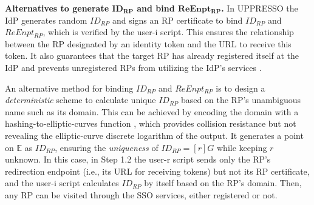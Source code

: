%


\noindent \textbf{Alternatives to generate $\boldsymbol{ID_{RP}}$ and bind $\boldsymbol{ReEnpt_{RP}}$.}
In UPPRESSO the IdP generates random $ID_{RP}$ and signs an RP certificate to bind $ID_{RP}$ and $ReEnpt_{RP}$, which is verified by the user-i script.
This ensures the relationship between the RP designated by an identity token and the URL to receive this token.
It also guarantees that the target RP has already registered itself at the IdP and prevents unregistered RPs from utilizing the IdP's services \cite{OpenIDConnect,save-flow}.

An alternative method for binding $ID_{RP}$ and $ReEnpt_{RP}$ is
 to design a \emph{deterministic} scheme to calculate unique $ID_{RP}$ based on the RP's unambiguous name such as its domain.
This can be achieved by encoding the domain with a hashing-to-elliptic-curves function \cite{irtf-cfrg-hash-to-curve-16}, which provides collision resistance but not revealing the elliptic-curve discrete logarithm of the output. It generates a point on $\mathbb{E}$ as $ID_{RP}$, ensuring the \emph{uniqueness} of $ID_{RP} = [r]G$ while keeping $r$ unknown. %
In this case, in Step 1.2 the user-r script sends only the RP's redirection endpoint (i.e., its URL for receiving tokens) but not its RP certificate, and the user-i script calculates $ID_{RP}$ by itself based on the RP's domain. 
Then, any RP can be visited through the SSO services, either registered or not.

